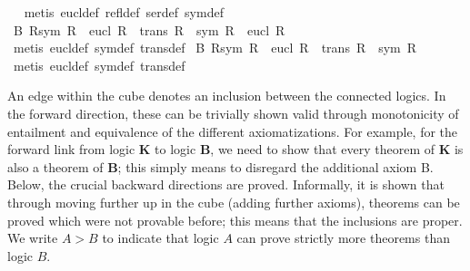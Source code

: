 \begin{isabellebody}
%
\isadelimproof
\ %
\endisadelimproof
%
\isatagproof
{}\isamarkupfalse%
\ {\isacharparenleft}metis\ eucl{\isacharunderscore}def\ refl{\isacharunderscore}def\ ser{\isacharunderscore}def\ sym{\isacharunderscore}def{\isacharparenright}%
\endisatagproof
{\isafoldproof}%
%
\isadelimproof
%
\endisadelimproof
%
\isamarkuptrue%
\isamarkupfalse%
\ B{}{\isacharcolon}\ {\isachardoublequoteopen}{\isasymforall}R{\isachardot}{\isacharparenleft}{\isacharparenleft}sym\ R{\isacharparenright}\ {\isasymand}\ {\isacharparenleft}eucl\ R{\isacharparenright}{\isacharparenright}\ {\isasymlongleftrightarrow}\ {\isacharparenleft}{\isacharparenleft}trans\ R{\isacharparenright}\ {\isasymand}\ {\isacharparenleft}sym\ R{\isacharparenright}\ {\isasymand}\ {\isacharparenleft}eucl\ R{\isacharparenright}{\isacharparenright}{\isachardoublequoteclose}\isanewline
%
\isadelimproof
\ %
\endisadelimproof
%
\isatagproof
{}\isamarkupfalse%
\ {\isacharparenleft}metis\ eucl{\isacharunderscore}def\ sym{\isacharunderscore}def\ trans{\isacharunderscore}def{\isacharparenright}%
\endisatagproof
{\isafoldproof}%
%
\isadelimproof
%
\endisadelimproof
%
\isamarkuptrue%
\isamarkupfalse%
\ B{}{\isacharcolon}\ {\isachardoublequoteopen}{\isasymforall}R{\isachardot}{\isacharparenleft}{\isacharparenleft}sym\ R{\isacharparenright}\ {\isasymand}\ {\isacharparenleft}eucl\ R{\isacharparenright}{\isacharparenright}\ {\isasymlongleftrightarrow}\ {\isacharparenleft}{\isacharparenleft}trans\ R{\isacharparenright}\ {\isasymand}\ {\isacharparenleft}sym\ R{\isacharparenright}{\isacharparenright}{\isachardoublequoteclose}\isanewline
%
\isadelimproof
\ %
\endisadelimproof
%
\isatagproof
{}\isamarkupfalse%
\ {\isacharparenleft}metis\ eucl{\isacharunderscore}def\ sym{\isacharunderscore}def\ trans{\isacharunderscore}def{\isacharparenright}%
\endisatagproof
{\isafoldproof}%
%
\isadelimproof
%
\endisadelimproof
%
\isamarkuptrue%
%
\begin{isamarkuptext}%
An edge within the cube denotes an inclusion between the connected logics. In the forward direction, these can
be trivially shown valid through monotonicity of entailment and equivalence of the different
axiomatizations. For example, for the forward link from logic \textbf{K} to logic \textbf{B}, we need to show that every 
theorem of \textbf{K} is also a theorem of \textbf{B}; this simply means to
disregard the additional axiom B.
 Below, the crucial backward directions are proved. 
Informally, it is shown that through moving further
up in the cube (adding further axioms), theorems can be proved which were not provable before; this means
that the inclusions are proper.
We write $A > B$ to indicate that logic $A$ can prove strictly more theorems than logic $B$.


\end{isamarkuptext}
\end{isabellebody}
